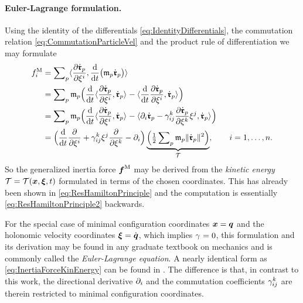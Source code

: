 \paragraph{Euler-Lagrange formulation.}
Using the identity of the differentials \eqref{eq:IdentityDifferentials}, the commutation relation \eqref{eq:CommutationParticleVel} and the product rule of differentiation we may formulate
\begin{align}
 \genForceInertiaCoeff{\LidxI}
 &= \sumParticles \sProd{\pdiff[\particlePosd{\PidxI}]{\sysVelCoeff{\LidxI}}}{\diff{t}\big(\particleMass{\PidxI} \particlePosd{\PidxI}\big)}
\nonumber\\
 &= \sumParticles \particleMass{\PidxI}  \Big( \diff{t} \sProd{\pdiff[\particlePosd{\PidxI}]{\sysVelCoeff{\LidxI}}}{\particlePosd{\PidxI}} - \sProd{\diff{t} \pdiff[\particlePosd{\PidxI}]{\sysVelCoeff{\LidxI}}}{\particlePosd{\PidxI}}\Big)
\nonumber\\
 &= \sumParticles \particleMass{\PidxI}  \Big( \diff{t} \sProd{\pdiff[\particlePosd{\PidxI}]{\sysVelCoeff{\LidxI}}}{\particlePosd{\PidxI}} - \sProd{\dirDiff{\LidxI} \particlePosd{\PidxI} - \BoltzSym{\LidxIII}{\LidxI}{\LidxII} \pdiff[\particlePosd{\PidxI}]{\sysVelCoeff{\LidxIII}} \sysVelCoeff{\LidxII}}{\particlePosd{\PidxI}}\Big)
\nonumber\\
 &= \Big(\diff{t} \pdiff{\sysVelCoeff{\LidxI}} + \BoltzSym{\LidxIII}{\LidxI}{\LidxII} \sysVelCoeff{\LidxII} \pdiff{\sysVelCoeff{\LidxIII}} - \dirDiff{\LidxI} \Big)
 \underbrace{\Big( \tfrac{1}{2} \sumParticles \particleMass{\PidxI} \norm{\particlePosd{\PidxI}}^2 \Big)}_{\kineticEnergy},
 \qquad
 \LidxI = 1,\ldots,\dimConfigSpace.
\label{eq:InertiaForceKinEnergy}
\end{align}
So the generalized inertia force $\genForceInertia$ may be derived from the \textit{kinetic energy} $\kineticEnergy = \kineticEnergy(\sysCoord, \sysVel, t)$ formulated in terms of the chosen coordinates.
This has already been shown in \eqref{eq:ResHamiltonPrinciple} and the computation is essentially \eqref{eq:ResHamiltonPrinciple2} backwards.

For the special case of minimal configuration coordinates $\sysCoord=\genCoord$ and the holonomic velocity coordinates $\sysVel=\genCoordd$, which implies $\BoltzSym{}{}{} = 0$, this formulation and its derivation may be found in any graduate textbook on mechanics and is commonly called the \textit{Euler-Lagrange equation}.
A nearly identical form as \eqref{eq:InertiaForceKinEnergy} can be found in \cite[p.\ 17]{Hamel:LagrangeEuler}.
The difference is that, in contrast to this work, the directional derivative $\dirDiff{\LidxI}$ and the commutation coefficients $\BoltzSym{\LidxIII}{\LidxI}{\LidxII}$ are therein restricted to minimal configuration coordinates. 

